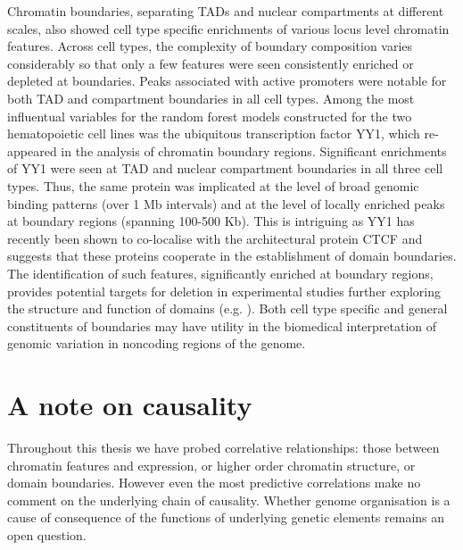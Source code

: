 \documentclass[a4paper,11pt,oneside]{book}
\begin{document}
Chromatin boundaries, separating TADs and nuclear compartments at
different scales, also showed cell type specific enrichments of
various locus level chromatin features. Across cell types, the
complexity of boundary composition varies considerably so that only a
few features were seen consistently enriched or depleted at
boundaries. Peaks associated with active promoters were notable for
both TAD and compartment boundaries in all cell types. Among the most
influentual variables for the random forest models constructed for the
two hematopoietic cell lines was the ubiquitous transcription factor
YY1, which re-appeared in the analysis of chromatin boundary
regions. Significant enrichments of YY1 were seen at TAD and nuclear
compartment boundaries in all three cell types. Thus, the same protein
was implicated at the level of broad genomic binding patterns (over 1
Mb intervals) and at the level of locally enriched peaks at boundary
regions (spanning 100-500 Kb). This is intriguing as YY1 has recently
been shown to co-localise with the architectural protein
CTCF \cite{Ong2014} and suggests that these proteins cooperate in the
establishment of domain boundaries. The identification of such
features, significantly enriched at boundary regions, provides
potential targets for deletion in experimental studies further
exploring the structure and function of domains
(e.g. \cite{Nora2012}). Both cell type specific and general
constituents of boundaries may have utility in the biomedical
interpretation of genomic variation in noncoding regions of the
genome.

\section{A note on causality}


Throughout this thesis we have probed correlative relationships: those between chromatin features and expression, or higher order chromatin structure, or domain boundaries. However even the most predictive correlations make no comment on the underlying chain of causality. Whether genome organisation is a cause of consequence of the functions of underlying genetic elements remains an open question.\cite{Sexton2015}

\end{document}
